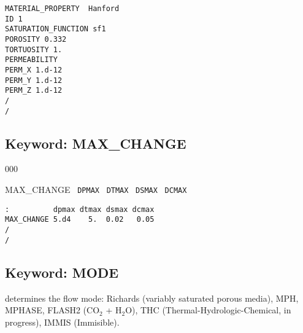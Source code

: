 \documentclass[12pt]{article}
\begin{document}

\begin{verbatim}
MATERIAL_PROPERTY  Hanford
ID 1
SATURATION_FUNCTION sf1
POROSITY 0.332
TORTUOSITY 1.
PERMEABILITY
PERM_X 1.d-12
PERM_Y 1.d-12
PERM_Z 1.d-12
/
/
\end{verbatim}


\newpage
\protect\hypertarget{target_max}{}

\subsection{Keyword: MAX\_CHANGE}


\begin{deflist}{000}
\item[MAX\_CHANGE] \ {\tt DPMAX} \ {\tt DTMAX} \ {\tt DSMAX} \ {\tt DCMAX}
\end{deflist}


\begin{verbatim}
:          dpmax dtmax dsmax dcmax
MAX_CHANGE 5.d4    5.  0.02   0.05
/
/
\end{verbatim}


\newpage
\protect\hypertarget{target_mode}{}

\subsection{Keyword: MODE}

 determines the flow mode: Richards (variably saturated porous media), MPH, MPHASE, FLASH2 (CO$_2$ + H$_2$O), THC (Thermal-Hydrologic-Chemical, in pro\-gress), IMMIS (Immisible).

\begin{comment}
\noindent{\bf Input:}
\begin{deflist}{000}
\item[MODE] <option>
\item[Options:] ~
\begin{deflist}{000}
\item[RICHARDS]
\item[MPHASE (MPH)]
\item[FLASH2]
\item[THC (\rm in progress)]
\item[IMMIS (IMS, THS)]
\end{deflist}
\end{deflist}
\end{comment}
\end{document}

